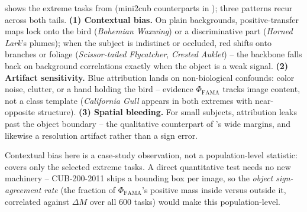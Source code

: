  shows the extreme tasks from  (mini2cub counterparts in ); three patterns recur across both tails. \textbf{(1) Contextual bias.} On plain backgrounds, positive-transfer maps lock onto the bird (\emph{Bohemian Waxwing}) or a discriminative part (\emph{Horned Lark}'s plumes); when the subject is indistinct or occluded, red shifts onto branches or foliage (\emph{Scissor-tailed Flycatcher}, \emph{Crested Auklet}) -- the backbone falls back on background correlations exactly when the object is a weak signal. \textbf{(2) Artifact sensitivity.} Blue attribution lands on non-biological confounds: color noise, clutter, or a hand holding the bird -- evidence $\Phi_{\mathrm{FAMA}}$ tracks image content, not a class template (\emph{California Gull} appears in both extremes with near-opposite structure). \textbf{(3) Spatial bleeding.} For small subjects, attribution leaks past the object boundary -- the qualitative counterpart of 's wide margins, and likewise a resolution artifact rather than a sign error.

Contextual bias here is a case-study observation, not a population-level statistic:  covers only the selected extreme tasks. A direct quantitative test needs no new machinery -- CUB-200-2011 ships a bounding box per image, so the \emph{object sign-agreement rate} (the fraction of $\Phi_{\mathrm{FAMA}}$'s positive mass inside versus outside it, correlated against $\Delta M$ over all 600 tasks) would make this population-level.
